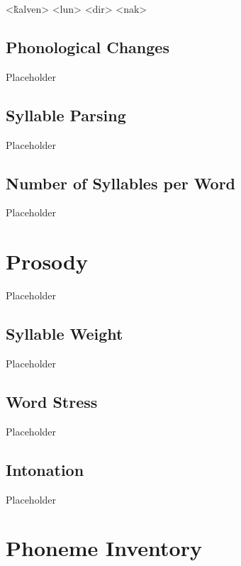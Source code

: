 	\a<ǩalven>   
	\a<lun>   
	\a<dir>   
	\a<nak>   
\xe

\subsection{Phonological Changes}
\label{subsec:tvk-phone-changes}

Placeholder

\subsection{Syllable Parsing}
\label{subsec:tvk-syll-parse}

Placeholder

\subsection{Number of Syllables per Word}
\label{subsec:tvk-num-syll}

Placeholder

\section{\langtvk{} Prosody}
\label{sec:tvk-prosody}

Placeholder

\subsection{Syllable Weight}
\label{subsec:tvk-syll-weight}

Placeholder

\subsection{Word Stress}
\label{subsec:tvk-word-stress}

Placeholder

\subsection{Intonation}
\label{subsec:tvk-intonation}

Placeholder

\section{\langank{} Phoneme Inventory}
\label{sec:ank-phone-inventory}

